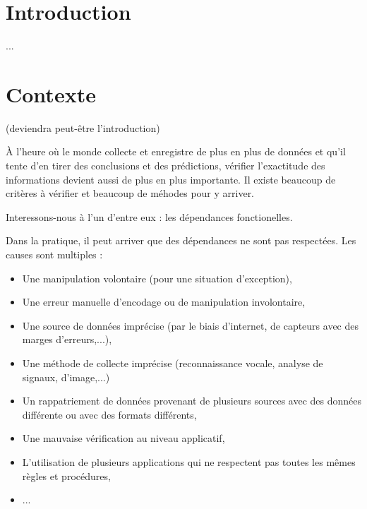 \documentclass[12pt, a4paper, oneside, titlepage]{book}%
\begin{document}
\newpage
\pagestyle{fancy}  %
\mainmatter  %
\chapter{Introduction}\label{CHintro}
...
\vspace*{20mm}


\cleardoublepage %
\chapter{Contexte}\label{CHcontexte}
(deviendra peut-être l'introduction)

\`{A} l'heure où le monde collecte et enregistre de plus en plus de données et qu'il tente d'en tirer des conclusions et des prédictions, vérifier l'exactitude des informations devient aussi de plus en plus importante. Il existe beaucoup de critères à vérifier et beaucoup de méhodes pour y arriver.

Interessons-nous à l'un d'entre eux : les dépendances fonctionelles.

Dans la pratique, il peut arriver que des dépendances ne sont pas respectées. Les causes sont multiples :
\begin{itemize}
\item Une manipulation volontaire (pour une situation d'exception), 
\item Une erreur manuelle d'encodage ou de manipulation involontaire, 
\item Une source de données imprécise (par le biais d'internet, de capteurs avec des marges d'erreurs,...), 
\item Une méthode de collecte imprécise (reconnaissance vocale, analyse de signaux, d'image,...)
\item Un rappatriement de données provenant de plusieurs sources avec des données différente ou avec des formats différents,
\item Une mauvaise vérification au niveau applicatif,
\item L'utilisation de plusieurs applications qui ne respectent pas toutes les mêmes règles et procédures,
\item ...
\end{itemize}
\end{document}

